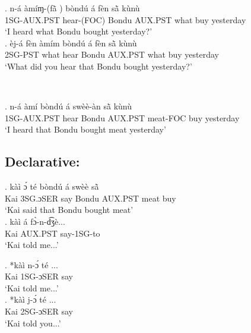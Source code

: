 \documentclass{assets/fieldnotes}
\begin{document}
\exg. n-á àmíɱ-(fã̀ ) bòndú á fèn sã̀  kùnù\\
1SG-AUX.PST hear-(FOC) Bondu AUX.PST what buy yesterday\\
`I heard what Bondu bought yesterday?' \\

\exg. èj-á fèn àmím bòndú á fèn sã̀  kùnù\\
2SG-PST what hear Bondu AUX.PST what buy yesterday\\
`What did you hear that Bondu bought yesterday?' 

\\


\exg. n-á àmí bòndú á swèè-àn sã̀  kùnù\\
1SG-AUX.PST hear Bondu AUX.PST meat-FOC buy yesterday\\
`I heard that Bondu bought meat yesterday' \\


\subsection{Declarative:}

\exg. kàì ɔ́ té bòndú á swèè sã̀\\
Kai 3SG.ɔSER say Bondu AUX.PST meat buy\\
`Kai said that Bondu bought meat' \\

\exg. kàì á fɔ̀-n-d͡ʒè...\\
Kai AUX.PST say-1SG-to \\
`Kai told me...' \\


\exg. *kàì n-ɔ́ té ...\\
Kai 1SG-ɔSER say \\
`Kai told me...' \\

\exg. *kàì j-ɔ́ té ...\\
Kai 2SG-ɔSER say \\
`Kai told you...' \\
\end{document}
